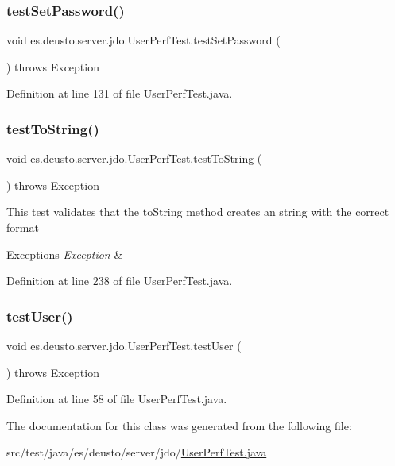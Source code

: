 \subsubsection{\texorpdfstring{test\+Set\+Password()}{testSetPassword()}}
{\footnotesize\ttfamily void es.\+deusto.\+server.\+jdo.\+User\+Perf\+Test.\+test\+Set\+Password (\begin{DoxyParamCaption}{ }\end{DoxyParamCaption}) throws Exception}



Definition at line 131 of file User\+Perf\+Test.\+java.

\mbox{\label{classes_1_1deusto_1_1server_1_1jdo_1_1_user_perf_test_a6744a929575c948f3a725bc07ea17dd6}} 
\subsubsection{\texorpdfstring{test\+To\+String()}{testToString()}}
{\footnotesize\ttfamily void es.\+deusto.\+server.\+jdo.\+User\+Perf\+Test.\+test\+To\+String (\begin{DoxyParamCaption}{ }\end{DoxyParamCaption}) throws Exception}

This test validates that the to\+String method creates an string with the correct format 
\begin{DoxyExceptions}{Exceptions}
{\em Exception} & \\
\hline
\end{DoxyExceptions}


Definition at line 238 of file User\+Perf\+Test.\+java.

\mbox{\label{classes_1_1deusto_1_1server_1_1jdo_1_1_user_perf_test_a556ef1732826be65497e0979bb7d063a}} 
\subsubsection{\texorpdfstring{test\+User()}{testUser()}}
{\footnotesize\ttfamily void es.\+deusto.\+server.\+jdo.\+User\+Perf\+Test.\+test\+User (\begin{DoxyParamCaption}{ }\end{DoxyParamCaption}) throws Exception}



Definition at line 58 of file User\+Perf\+Test.\+java.



The documentation for this class was generated from the following file\+:\begin{DoxyCompactItemize}
\item 
src/test/java/es/deusto/server/jdo/\hyperlink{_user_perf_test_8java}{User\+Perf\+Test.\+java}\end{DoxyCompactItemize}
